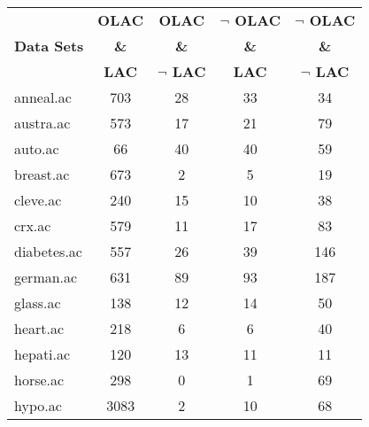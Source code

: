 \begin{table}[htbp]
	\centering
		\begin{tabular}{|l|c|c|c|c|}
		\hline
				& \textbf{OLAC}		& \textbf{OLAC}			& \textbf{$\neg$ OLAC}	& \textbf{$\neg$ OLAC}	\\
		\textbf{Data Sets}	& \textbf{\&}		& \textbf{\&}			& \textbf{\&}			& \textbf{\&}			\\
				& \textbf{LAC}		& \textbf{$\neg$ LAC}		& \textbf{LAC}			& \textbf{$\neg$ LAC}		\\
		\hline
		anneal.ac       & 703           & 28                 & 33                       & 34                            \\
		\hline
		austra.ac       & 573           & 17                 & 21                       & 79                            \\
		\hline
		auto.ac         & 66            & 40                 & 40                       & 59                            \\
		\hline
		breast.ac       & 673           & 2                  & 5                        & 19                            \\
		\hline
		cleve.ac        & 240           & 15                 & 10                       & 38                            \\
		\hline
		crx.ac          & 579           & 11                 & 17                       & 83                            \\
		\hline
		diabetes.ac     & 557           & 26                 & 39                       & 146                           \\
		\hline
		german.ac       & 631           & 89                 & 93                       & 187                           \\
		\hline
		glass.ac        & 138           & 12                 & 14                       & 50                            \\
		\hline
		heart.ac        & 218           & 6                  & 6                        & 40                            \\
		\hline
		hepati.ac       & 120           & 13                 & 11                       & 11                            \\
		\hline
		horse.ac        & 298           & 0                  & 1                        & 69                            \\
		\hline
		hypo.ac         & 3083          & 2                  & 10                       & 68                            \\

\end{tabular}
\end{table}
